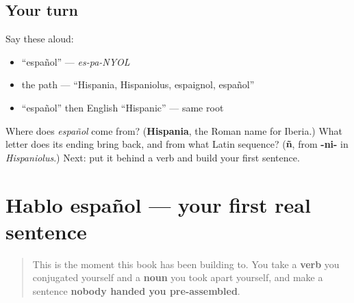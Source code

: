 \subsection*{Your turn}
Say these aloud:

\begin{itemize}
\raggedright
  \item \textquotedblleft{}español\textquotedblright{} — \emph{es-pa-NYOL}
  \item the path — \textquotedblleft{}Hispania, Hispaniolus, espaignol, español\textquotedblright{}
  \item \textquotedblleft{}español\textquotedblright{} then English \textquotedblleft{}Hispanic\textquotedblright{} — same root
\end{itemize}

\begin{tcolorbox}[breakable,colback=teal!4,colframe=teal!35!black,title={Before you move on}]
Where does \emph{español} come from? (\textbf{Hispania}, the Roman name for Iberia.) What letter does its ending bring back, and from what Latin sequence? (\textbf{ñ}, from \textbf{-ni-} in \emph{Hispaniolus}.) Next: put it behind a verb and build your first sentence.
\end{tcolorbox}
\section[Hablo español]{Hablo español — your first real sentence}

\label{lesson:ES-C06-hablo-espanol}



\begin{quote}
This is the moment this book has been building to. You take a \textbf{verb} you conjugated yourself and a \textbf{noun} you took apart yourself, and make a sentence \textbf{nobody handed you pre-assembled}.
\end{quote}

